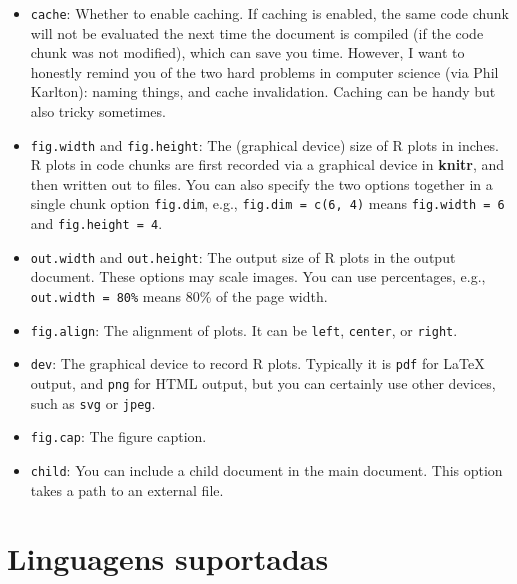 \documentclass[
]{book}
\newenvironment{Shaded}{\begin{snugshade}}{\end{snugshade}}
\newcommand{\KeywordTok}[1]{\textcolor[rgb]{0.13,0.29,0.53}{\textbf{#1}}}
\newcommand{\NormalTok}[1]{#1}
\newcommand{\OperatorTok}[1]{\textcolor[rgb]{0.81,0.36,0.00}{\textbf{#1}}}
\begin{document}
\begin{itemize}
\item
  \texttt{cache}: Whether to enable caching. If caching is enabled, the same code chunk will not be evaluated the next time the document is compiled (if the code chunk was not modified), which can save you time. However, I want to honestly remind you of the two hard problems in computer science (via Phil Karlton): naming things, and cache invalidation. Caching can be handy but also tricky sometimes.
\item
  \texttt{fig.width} and \texttt{fig.height}: The (graphical device) size of R plots in inches. R plots in code chunks are first recorded via a graphical device in \textbf{knitr}, and then written out to files. You can also specify the two options together in a single chunk option \texttt{fig.dim}, e.g., \texttt{fig.dim\ =\ c(6,\ 4)} means \texttt{fig.width\ =\ 6} and \texttt{fig.height\ =\ 4}.
\item
  \texttt{out.width} and \texttt{out.height}: The output size of R plots in the output document. These options may scale images. You can use percentages, e.g., \texttt{out.width\ =\ \textquotesingle{}80\%\textquotesingle{}} means 80\% of the page width.
\item
  \texttt{fig.align}: The alignment of plots. It can be \texttt{\textquotesingle{}left\textquotesingle{}}, \texttt{\textquotesingle{}center\textquotesingle{}}, or \texttt{\textquotesingle{}right\textquotesingle{}}.
\item
  \texttt{dev}: The graphical device to record R plots. Typically it is \texttt{\textquotesingle{}pdf\textquotesingle{}} for LaTeX output, and \texttt{\textquotesingle{}png\textquotesingle{}} for HTML output, but you can certainly use other devices, such as \texttt{\textquotesingle{}svg\textquotesingle{}} or \texttt{\textquotesingle{}jpeg\textquotesingle{}}.
\item
  \texttt{fig.cap}: The figure caption.
\item
  \texttt{child}: You can include a child document in the main document. This option takes a path to an external file.
\end{itemize}

\hypertarget{linguagens-suportadas}{%
\section{Linguagens suportadas}\label{linguagens-suportadas}}

\begin{Shaded}
\end{Shaded}
\end{document}
